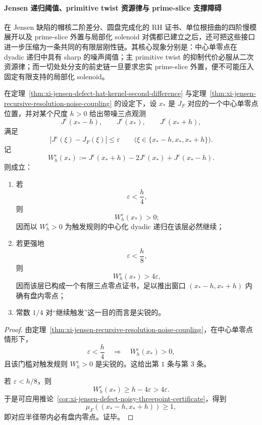\paragraph{Jensen 递归阈值、primitive twist 资源律与 prime-slice 支撑障碍}
在 Jensen 缺陷的帽核二阶差分、圆盘完成化的 RH 证书、单位根扭曲的四阶慢模展开以及 prime-slice 外置与局部化 solenoid 对偶都已建立之后，还可把这些接口进一步压缩为一条共同的有限层刚性链。其核心现象分别是：中心单零点在 dyadic 递归中具有 sharp 的噪声阈值；主 primitive twist 的抑制代价必服从二次资源律；而一切处处分支的前史链一旦要求忠实 prime-slice 外置，便不可能压入固定有限支持的局部化 solenoid。

\begin{theorem}\label{thm:xi-time-part9zq-jensen-central-root-threshold}
在定理~\ref{thm:xi-jensen-defect-hat-kernel-second-difference} 与定理~\ref{thm:xi-jensen-recursive-resolution-noise-coupling} 的设定下，设 \(x_\ast\) 是 \(J_F\) 对应的一个中心单零点位置，并对某个尺度 \(h>0\) 给出带噪三点观测
\[
J^\varepsilon(x_\ast-h),\qquad
J^\varepsilon(x_\ast),\qquad
J^\varepsilon(x_\ast+h),
\]
满足
\[
\left|J^\varepsilon(\xi)-J_F(\xi)\right|\le \varepsilon
\qquad
\bigl(\xi\in\{x_\ast-h,x_\ast,x_\ast+h\}\bigr).
\]
记
\[
W_h^\varepsilon(x_\ast)
:=
J^\varepsilon(x_\ast+h)-2J^\varepsilon(x_\ast)+J^\varepsilon(x_\ast-h).
\]
则成立：
\begin{enumerate}
  \item 若
  \[
  \varepsilon<\frac{h}{4},
  \]
  则
  \[
  W_h^\varepsilon(x_\ast)>0;
  \]
  因而以 \(W_h^\varepsilon>0\) 为触发规则的中心化 dyadic 递归在该层必然继续；
  \item 若更强地
  \[
  \varepsilon<\frac{h}{8},
  \]
  则
  \[
  W_h^\varepsilon(x_\ast)>4\varepsilon,
  \]
  因而该层已构成一个有限三点零点证书，足以推出窗口 \((x_\ast-h,x_\ast+h)\) 内确有盘内零点；
  \item 常数 \(1/4\) 对“继续触发”这一目的而言是尖锐的。
\end{enumerate}
\end{theorem}
\begin{proof}
由定理~\ref{thm:xi-jensen-recursive-resolution-noise-coupling}，在中心单零点情形下，
\[
\varepsilon<\frac{h}{4}
\quad\Longrightarrow\quad
W_h^\varepsilon(x_\ast)>0,
\]
且该门槛对触发规则 \(W_h^\varepsilon>0\) 是尖锐的。这给出第 \(1\) 条与第 \(3\) 条。

若 \(\varepsilon<h/8\)，则
\[
W_h^\varepsilon(x_\ast)\ge h-4\varepsilon>4\varepsilon.
\]
于是可应用推论~\ref{cor:xi-jensen-defect-noisy-threepoint-certificate}，得到
\[
\mu_F((x_\ast-h,x_\ast+h))\ge 1,
\]
即对应半径带内必有盘内零点。证毕。
\end{proof}

